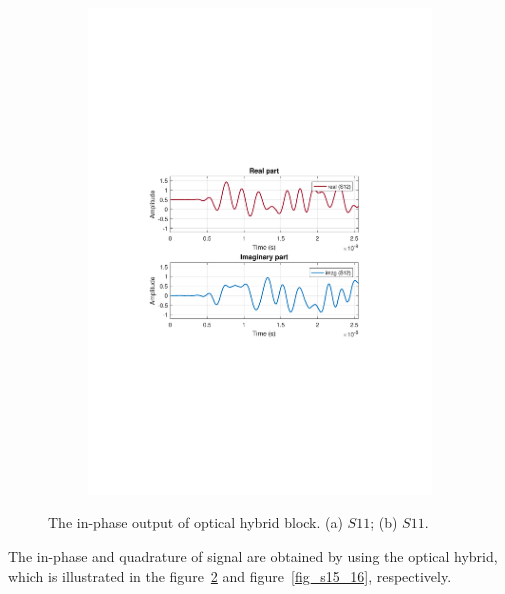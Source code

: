 \begin{refsection}
\begin{figure}[h!]
\begin{subfigure}{.5\textwidth}
  \includegraphics[width=\linewidth]{./sdf/dsp_laser_phase_compensation/figures/S12_td.pdf}
  \caption{}
  \label{fig:sub2}
\end{subfigure}
\caption{The in-phase output of optical hybrid block. (a) $S11$; (b) $S11$.}
\label{fig_s11_12}
\end{figure}


The in-phase and quadrature of signal are obtained by using the optical hybrid, which is illustrated in the figure~\ref{fig_s11_12} and figure~\ref{fig_s15_16}, respectively.


\end{refsection}
